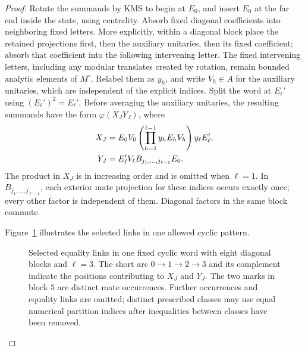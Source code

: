 \begin{proof}
Rotate the summands by KMS to begin at $E_0$, and insert $E_0$ at the
far end inside the state, using centrality. Absorb fixed diagonal
coefficients into neighboring fixed letters. More explicitly, within
a diagonal block place the retained projections first, then the
auxiliary unitaries, then its fixed coefficient; absorb that coefficient
into the following intervening letter. The fixed intervening letters,
including any modular translates created by rotation, remain bounded
analytic elements of $M^\circ$. Relabel them as $y_h$, and write $V_h\in A$ for the auxiliary unitaries,
which are independent of the explicit indices. Split the word at
$E_\ell'$ using $(E_\ell')^2=E_\ell'$. Before averaging the auxiliary
unitaries, the resulting summands have the form $\varphi(X_JY_J)$, where
\begin{align}
 X_J
  &=E_0V_0
       \left(\prod_{h=1}^{\ell-1}y_hE_hV_h\right)
          y_\ell E_\ell',
 \notag\\
 Y_J
  &=E_\ell'V_\ell
       B_{j_1,\ldots,j_{\ell-1}}E_0.
 \label{eq:shortest-pair-factors}
\end{align}
The product in $X_J$ is in increasing order and is omitted when
$\ell=1$. In $B_{j_1,\ldots,j_{\ell-1}}$, each exterior mate projection
for these indices occurs exactly once; every other factor is independent
of them. Diagonal factors in the same block commute.

Figure~\ref{fig:shortest-pair} illustrates the selected links in one
allowed cyclic pattern.
\begin{figure}[ht]
\centering

\caption{Selected equality links in one fixed cyclic word with eight diagonal
blocks and $\ell=3$. The short arc $0\to1\to2\to3$ and its complement
indicate the positions contributing to $X_J$ and $Y_J$. The two marks in
block $5$ are distinct mate occurrences. Further occurrences and equality
links are omitted; distinct prescribed classes may use equal numerical
partition indices after inequalities between classes have been removed.}
\label{fig:shortest-pair}
\end{figure}


\end{proof}
